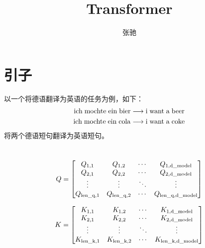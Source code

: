 \documentclass[letterpaper,11pt]{article}
\numberwithin{equation}{section}
\begin{document}
\title{Transformer}
\author{张驰}
\maketitle

\section{引子}

以一个将德语翻译为英语的任务为例，如下：
$$
    \begin{aligned}
        {\rm ich\;mochte\;ein\;bier} \longrightarrow & \; {\rm i\;want\;a\;beer} \\
        {\rm ich\;mochte\;ein\;cola} \longrightarrow & \; {\rm i\;want\;a\;coke}
    \end{aligned}
$$
将两个德语短句翻译为英语短句。

\section{}

\begin{equation}
    Q = \begin{bmatrix}
        Q_{1,1}            & Q_{1,2}            & \cdots & Q_{1,{\rm d\_model}}            \\
        Q_{2,1}            & Q_{2,2}            & \cdots & Q_{2,{\rm d\_model}}            \\
        \vdots             & \vdots             & \ddots & \vdots                          \\
        Q_{{\rm len\_q},1} & Q_{{\rm len\_q},2} & \cdots & Q_{{\rm len\_q},{\rm d\_model}}
    \end{bmatrix}
\end{equation}

\begin{equation}
    K = \begin{bmatrix}
        K_{1,1}            & K_{1,2}            & \cdots & K_{1,{\rm d\_model}}            \\
        K_{2,1}            & K_{2,2}            & \cdots & K_{2,{\rm d\_model}}            \\
        \vdots             & \vdots             & \ddots & \vdots                          \\
        K_{{\rm len\_k},1} & K_{{\rm len\_k},2} & \cdots & K_{{\rm len\_k},{\rm d\_model}}
    \end{bmatrix}
\end{equation}
\end{document}
